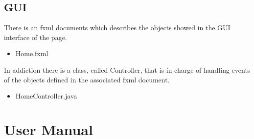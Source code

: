 \documentclass[a4paper, oneside]{article}
\begin{document}
\clearpage

\subsection{GUI}
There is an fxml documents which describes the objects showed in the GUI interface of the  page.
\begin{itemize}
\item Home.fxml
\end{itemize}
In addiction there is a class, called Controller, that is in charge of handling events of the objects defined in the associated fxml document.
\begin{itemize}
\item HomeController.java
\end{itemize}

\clearpage
\section{User Manual}
\end{document}
